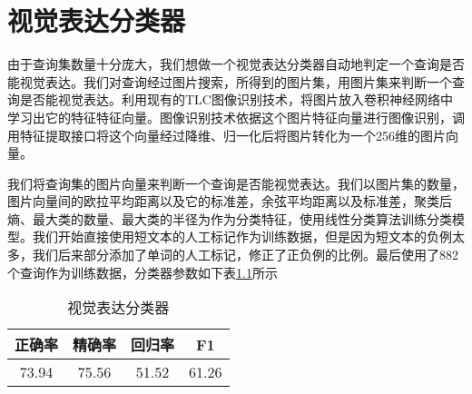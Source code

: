 \chapter{视觉表达分类器}

由于查询集数量十分庞大，我们想做一个视觉表达分类器自动地判定一个查询是否能视觉表达。我们对查询经过图片搜索，所得到的图片集，用图片集来判断一个查询是否能视觉表达。利用现有的TLC图像识别技术，将图片放入卷积神经网络中学习出它的特征特征向量。图像识别技术依据这个图片特征向量进行图像识别，调用特征提取接口将这个向量经过降维、归一化后将图片转化为一个256维的图片向量。

我们将查询集的图片向量来判断一个查询是否能视觉表达。我们以图片集的数量，图片向量间的欧拉平均距离以及它的标准差，余弦平均距离以及标准差，聚类后熵、最大类的数量、最大类的半径为作为分类特征，使用线性分类算法训练分类模型。我们开始直接使用短文本的人工标记作为训练数据，但是因为短文本的负例太多，我们后来部分添加了单词的人工标记，修正了正负例的比例。最后使用了882个查询作为训练数据，分类器参数如下表\ref{tab:svm_result}所示

\begin{table}[htbp]
\centering
\caption{视觉表达分类器} \label{tab:svm_result}
\begin{tabular}{ |c|c|c|c|}
    \hline
		正确率 & 精确率 & 回归率 &  F1\\
	\hline 
		73.94 & 75.56 & 51.52 & 61.26 \\
 	\hline
\end{tabular}
\end{table}